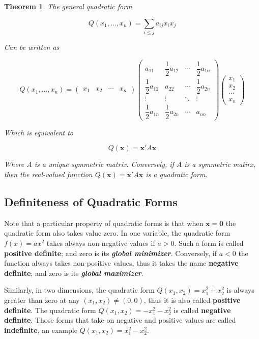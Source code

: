 \documentclass[a4paper,11pt]{article}
\theoremstyle{definition}
\theoremstyle{plain}
\newtheorem{theorem}{Theorem}
\begin{document}
\begin{theorem}
The general quadratic form

\[
Q(x_1, \ldots, x_n) = \sum_{i\leq j} a_{ij}x_i x_j
\]

Can be written as

\[
Q(x_1, \ldots, x_n) = \begin{pmatrix} x_1 & x_2 & \cdots & x_n \end{pmatrix} \begin{pmatrix} a_{11} & \dfrac{1}{2}a_{12} & \cdots & \dfrac{1}{2} a_{1n} \\ \dfrac{1}{2}a_{12} & a_{22} & \cdots & \dfrac{1}{2}a_{2n}\\ \vdots & \vdots & \ddots & \vdots \\ \dfrac{1}{2}a_{1n} & \dfrac{1}{2} a_{2n} & \cdots & a_{nn}\end{pmatrix} \begin{pmatrix} x_1 \\ x_2 \\ \cdots \\ x_n \end{pmatrix}
\]

Which is equivalent to

\[
Q(\mathbf{x}) = \mathbf{x}'A\mathbf{x}
\]

Where \(A\) is a unique symmetric matrix. Conversely, if \(A\) is a
symmetric matirx, then the real-valued function
\(Q(\mathbf{x}) = \mathbf{x}'A\mathbf{x}\) is a quadratic form.
\end{theorem}

\subsection{Definiteness of Quadratic
Forms}\label{definiteness-of-quadratic-forms}

Note that a particular property of quadratic forms is that when
\(\mathbf{x} = \mathbf{0}\) the quadratic form also takes value zero. In
one variable, the quadratic form \(f(x) = ax^2\) takes always
non-negative values if \(a > 0\). Such a form is called \textbf{positive
definite}; and zero is its \textbf{\emph{global minimizer}}. Conversely,
if \(a < 0\) the function always takes non-positive values, thus it
takes the name \textbf{negative definite}; and zero is its
\textbf{\emph{global maximizer}}.

Similarly, in two dimensions, the quadratic form
\(Q(x_1, x_2) = x_1^2 + x_2^2\) is always greater than zero at any
\((x_1, x_2) \neq (0, 0)\), thus it is also called \textbf{positive
definite}. The quadratic form \(Q(x_1, x_2) = - x_1^2 - x_2^2\) is
called \textbf{negative definite}. Those forms that take on negative and
positive values are called \textbf{indefinite}, an example
\(Q(x_1, x_2) = x_1^2 - x_2^2\).
\end{document}
